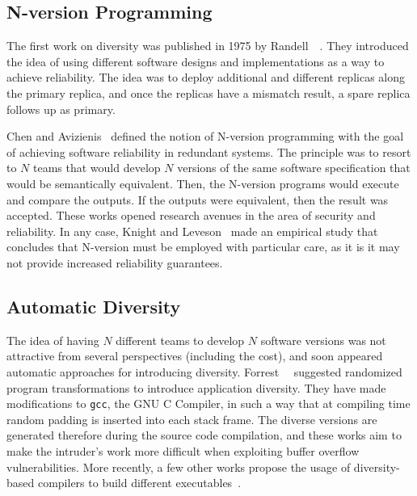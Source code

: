 \subsection{N-version Programming}
The first work on diversity was published in 1975 by Randell~\etal{}~\cite{Randell:1975}. 
They introduced the idea of using different software designs and implementations as a way to achieve reliability. 
The idea was to deploy additional and different replicas along the primary replica, and once the replicas have a mismatch result, a spare replica follows up as primary.


Chen and Avizienis~\cite{Avizienis:1977,Chen:1978} defined the notion of N-version programming with the goal of achieving software reliability in redundant systems.
The principle was to resort to $N$ teams that would develop $N$ versions of the same software specification that would be semantically equivalent.
Then, the N-version programs would execute and compare the outputs.
If the outputs were equivalent, then the result was accepted.
These works opened research avenues in the area of security and reliability.
In any case, Knight and Leveson~\cite{Knight:1986} made an empirical study that concludes that N-version must be employed with particular care, as it is it may not provide increased reliability guarantees. 

\subsection{Automatic Diversity}  
The idea of having $N$ different teams to develop $N$ software versions was not attractive from several perspectives (including the cost), and soon appeared automatic approaches for introducing diversity.
Forrest~\etal{}~\cite{Forrest:1997} suggested randomized program transformations to introduce application diversity.
They have made modifications to \texttt{gcc}, the GNU C Compiler, in such a way that at compiling time random padding is inserted into each stack frame. 
The diverse versions are generated therefore during the source code compilation, and these works aim to make the intruder’s work more difficult when exploiting buffer overflow vulnerabilities.
More recently, a few other works propose the usage of diversity-based compilers to build different executables~\cite{Platania:2014,Roeder:2010,King:2016,Koo:2018}.



